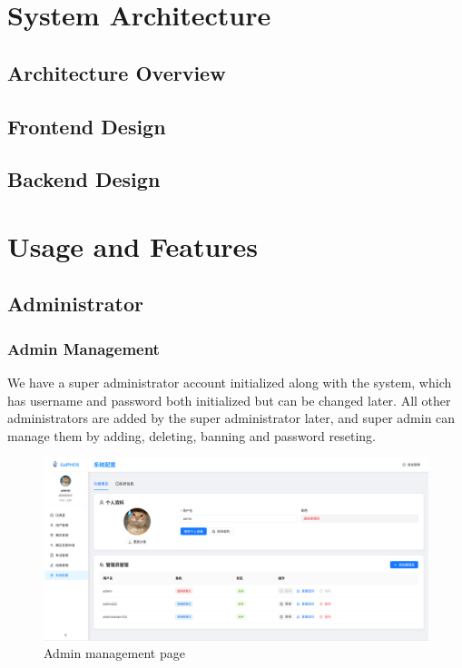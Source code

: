 \documentclass[12pt]{article}
\begin{document}
\section{System Architecture}
\subsection{Architecture Overview}
\subsection{Frontend Design}
\subsection{Backend Design}

\section{Usage and Features}
\subsection{Administrator}
\subsubsection{Admin Management}
We have a super administrator account initialized along with the system, which has username and password both initialized but can be changed later. All other administrators are added by
the super administrator later, and super admin can manage them by adding, deleting, banning and password reseting.
\begin{figure}[H]
    \centering
    \includegraphics[width=\textwidth]{admin/adminmanage.png}
    \caption{Admin management page}
    \label{fig:adminmanage page}
\end{figure}
\end{document}
